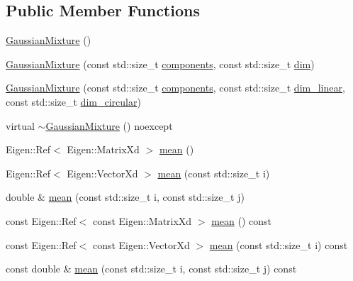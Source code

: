 \subsection*{Public Member Functions}
\begin{DoxyCompactItemize}
\item 
\mbox{\hyperlink{classbfl_1_1GaussianMixture_a0822b81102146cd9ba62223e41c97b38}{Gaussian\+Mixture}} ()
\item 
\mbox{\hyperlink{classbfl_1_1GaussianMixture_af2433812cdb02ca97c9cf6726683d31a}{Gaussian\+Mixture}} (const std\+::size\+\_\+t \mbox{\hyperlink{classbfl_1_1GaussianMixture_a02cc284327dbaa6b90c653dd2faccf88}{components}}, const std\+::size\+\_\+t \mbox{\hyperlink{classbfl_1_1GaussianMixture_a3f2b18801e72fa3bf0d6edc778662a8d}{dim}})
\item 
\mbox{\hyperlink{classbfl_1_1GaussianMixture_ab23a7e5d3646152dbd75cf50651ef896}{Gaussian\+Mixture}} (const std\+::size\+\_\+t \mbox{\hyperlink{classbfl_1_1GaussianMixture_a02cc284327dbaa6b90c653dd2faccf88}{components}}, const std\+::size\+\_\+t \mbox{\hyperlink{classbfl_1_1GaussianMixture_a22a0fbc77f90d9d75e89d7898484c05a}{dim\+\_\+linear}}, const std\+::size\+\_\+t \mbox{\hyperlink{classbfl_1_1GaussianMixture_a23f3b92753266475a9bff8ee7e1c9518}{dim\+\_\+circular}})
\item 
virtual \mbox{\hyperlink{classbfl_1_1GaussianMixture_aec7b09d8d2da90388879500466d4d349}{$\sim$\+Gaussian\+Mixture}} () noexcept
\item 
Eigen\+::\+Ref$<$ Eigen\+::\+Matrix\+Xd $>$ \mbox{\hyperlink{classbfl_1_1GaussianMixture_af4fd865a97ac27c72510cfbf9429bd97}{mean}} ()
\item 
Eigen\+::\+Ref$<$ Eigen\+::\+Vector\+Xd $>$ \mbox{\hyperlink{classbfl_1_1GaussianMixture_ad57440f7d524e5129afe70fc36f4fe99}{mean}} (const std\+::size\+\_\+t i)
\item 
double \& \mbox{\hyperlink{classbfl_1_1GaussianMixture_a21013d54d99ca5bfd1ec566a0815821e}{mean}} (const std\+::size\+\_\+t i, const std\+::size\+\_\+t j)
\item 
const Eigen\+::\+Ref$<$ const Eigen\+::\+Matrix\+Xd $>$ \mbox{\hyperlink{classbfl_1_1GaussianMixture_ad420f06f7680003453f64fd18bbb67da}{mean}} () const
\item 
const Eigen\+::\+Ref$<$ const Eigen\+::\+Vector\+Xd $>$ \mbox{\hyperlink{classbfl_1_1GaussianMixture_ad0dab37b16097d498dedaf23d0af3c18}{mean}} (const std\+::size\+\_\+t i) const
\item 
const double \& \mbox{\hyperlink{classbfl_1_1GaussianMixture_ac3baa237bc22f156f57d4c02deb4f518}{mean}} (const std\+::size\+\_\+t i, const std\+::size\+\_\+t j) const

\end{DoxyCompactItemize}
